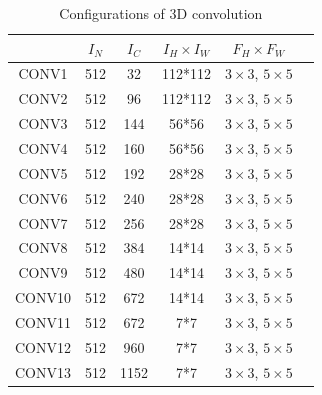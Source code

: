 \begin{table}[]
\caption{Configurations of 3D convolution}
\label{tab:3dconvconfigs}
\centering
\begin{tabular}{c|ccccc}
\hline
& $I_N$ & $I_C$ & $I_H \times I_W$ &  $F_H \times F_W$ \\
\hline
CONV1 & 512  & 32    & 112*112 & $3 \times 3$, $5 \times 5$  \\
CONV2 & 512  & 96    & 112*112  &$3 \times 3$, $5 \times 5$   \\
CONV3 & 512  & 144   & 56*56  &$3 \times 3$, $5 \times 5$    \\
CONV4 & 512  & 160    & 56*56  &$3 \times 3$, $5 \times 5$    \\
CONV5 & 512  & 192   & 28*28  &$3 \times 3$, $5 \times 5$    \\
CONV6 & 512  & 240   & 28*28  &$3 \times 3$, $5 \times 5$    \\
CONV7 & 512  & 256   & 28*28  &$3 \times 3$, $5 \times 5$    \\
CONV8 & 512  & 384   & 14*14  &$3 \times 3$, $5 \times 5$    \\
CONV9 & 512  & 480   & 14*14  &$3 \times 3$, $5 \times 5$    \\
CONV10 & 512  & 672  & 14*14 &$3 \times 3$, $5 \times 5$     \\
CONV11 & 512  &672  & 7*7 & $3 \times 3$, $5 \times 5$      \\
CONV12 & 512  &960  & 7*7 & $3 \times 3$, $5 \times 5$      \\
CONV13 & 512  &1152  & 7*7 & $3 \times 3$, $5 \times 5$      \\
\hline
\end{tabular}
\end{table}

